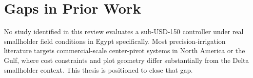 \section{Gaps in Prior Work}
No study identified in this review evaluates a sub-USD-150 controller under real smallholder
field conditions in Egypt specifically. Most precision-irrigation literature targets
commercial-scale center-pivot systems in North America or the Gulf, where cost constraints
and plot geometry differ substantially from the Delta smallholder context. This thesis is
positioned to close that gap.

